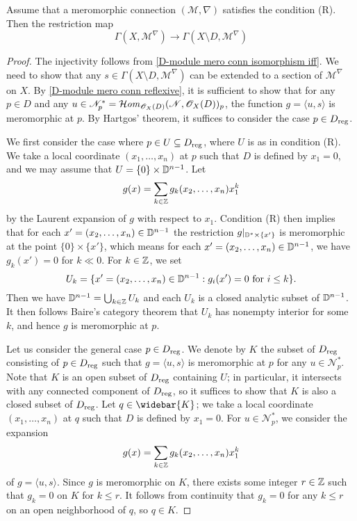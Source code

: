 \begin{lemma}\label{D-module mero conn condition R horizontal section isomorphism}
Assume that a meromorphic connection $(\mathscr{M},\nabla)$ satisfies the condition (R). Then the restriction map
\[\Gamma(X,\mathscr{M}^\nabla)\to\Gamma(X\setminus D,\mathscr{M}^\nabla)\]
\end{lemma}
\begin{proof}
The injectivity follows from \cref{D-module mero conn isomorphism iff}. We need to show that any $s\in\Gamma(X\setminus D,\mathscr{M}^\nabla)$ can be extended to a section of $\mathscr{M}^\nabla$ on $X$. By \cref{D-module mero conn reflexive}, it is sufficient to show that for any $p\in D$ and any $u\in\mathscr{N}_p^*=\operatorname{\mathcal{H}\hspace*{-0.4pt}\textit{om}\hspace{0.5pt}}_{\mathscr{O}_X(D)}(\mathscr{N},\mathscr{O}_X(D))_p$, the function $g=\langle u,s\rangle$ is meromorphic at $p$. By Hartgos' theorem, it suffices to consider the case $p\in D_{\mathrm{reg}}$.\par
We first consider the case where $p\in U\subseteq D_{\mathrm{reg}}$, where $U$ is as in condition (R). We take a local coordinate $(x_1,\dots,x_n)$ at $p$ such that $D$ is defined by $x_1=0$, and we may assume that $U=\{0\}\times\mathbb{D}^{n-1}$. Let
\[g(x)=\sum_{k\in\mathbb{Z}}g_k(x_2,\dots,x_n)x_1^k\]
by the Laurent expansion of $g$ with respect to $x_1$. Condition (R) then implies that for each $x'=(x_2,\dots,x_n)\in\mathbb{D}^{n-1}$ the restriction $g|_{\mathbb{D}^*\times\{x'\}}$ is meromorphic at the point $\{0\}\times\{x'\}$, which means for each $x'=(x_2,\dots,x_n)\in\mathbb{D}^{n-1}$, we have $g_k(x')=0$ for $k\ll 0$. For $k\in\mathbb{Z}$, we set
\[U_k=\{x'=(x_2,\dots,x_n)\in\mathbb{D}^{n-1}:\text{$g_i(x')=0$ for $i\leq k$}\}.\]
Then we have $\mathbb{D}^{n-1}=\bigcup_{k\in\mathbb{Z}}U_k$ and each $U_k$ is a closed analytic subset of $\mathbb{D}^{n-1}$. It then follows Baire's category theorem that $U_k$ has nonempty interior for some $k$, and hence $g$ is meromorphic at $p$.\par
Let us consider the general case $p\in D_{\mathrm{reg}}$. We denote by $K$ the subset of $D_{\mathrm{reg}}$ consisting of $p\in D_{\mathrm{reg}}$ such that $g=\langle u,s\rangle$ is meromorphic at $p$ for any $u\in\mathscr{N}_p^*$. Note that $K$ is an open subset of $D_{\mathrm{reg}}$ containing $U$; in particular, it intersects with any connected component of $D_{\mathrm{reg}}$, so it suffices to show that $K$ is also a closed subset of $D_{\mathrm{reg}}$. Let $q\in\widebar{K}$; we take a local coordinate $(x_1,\dots,x_n)$ at $q$ such that $D$ is defined by $x_1=0$. For $u\in\mathscr{N}_p^*$, we consider the expansion
\[g(x)=\sum_{k\in\mathbb{Z}}g_k(x_2,\dots,x_n)x_1^k\]
of $g=\langle u,s\rangle$. Since $g$ is meromorphic on $K$, there exists some integer $r\in\mathbb{Z}$ such that $g_k=0$ on $K$ for $k\leq r$. It follows from continuity that $g_k=0$ for any $k\leq r$ on an open neighborhood of $q$, so $q\in K$.
\end{proof}

